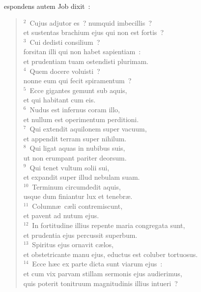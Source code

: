 \bchapter
{}espondens autem Job dixit~:
\begin{flushleft}\begin{verse}\vspace{6pt}${}^{2}$~Cujus adjutor es~? numquid imbecillis~?\\ et sustentas brachium ejus qui non est fortis~?\\
${}^{3}$~Cui dedisti consilium~?\\ forsitan illi qui non habet sapientiam~:\\ et prudentiam tuam ostendisti plurimam.\\
${}^{4}$~Quem docere voluisti~?\\ nonne eum qui fecit spiramentum~?\\
${}^{5}$~Ecce gigantes gemunt sub aquis,\\ et qui habitant cum eis.\\
${}^{6}$~Nudus est infernus coram illo,\\ et nullum est operimentum perditioni.\\
${}^{7}$~Qui extendit aquilonem super vacuum,\\ et appendit terram super nihilum.\\
${}^{8}$~Qui ligat aquas in nubibus suis,\\ ut non erumpant pariter deorsum.\\
${}^{9}$~Qui tenet vultum solii sui,\\ et expandit super illud nebulam suam.\\
${}^{10}$~Terminum circumdedit aquis,\\ usque dum finiantur lux et tenebr\ae .\\
${}^{11}$~Column\ae\ c\ae li contremiscunt,\\ et pavent ad nutum ejus.\\
${}^{12}$~In fortitudine illius repente maria congregata sunt,\\ et prudentia ejus percussit superbum.\\
${}^{13}$~Spiritus ejus ornavit c\ae los,\\ et obstetricante manu ejus, eductus est coluber tortuosus.\\
${}^{14}$~Ecce h\ae c ex parte dicta sunt viarum ejus~:\\ et cum vix parvam stillam sermonis ejus audierimus,\\ quis poterit tonitruum magnitudinis illius intueri~?\end{verse}\end{flushleft}



